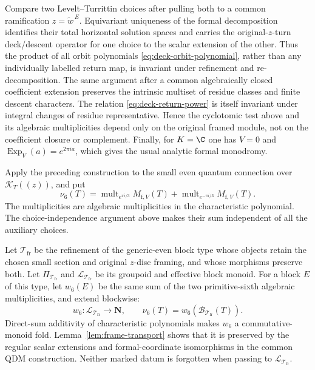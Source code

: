 Compare two Levelt--Turrittin choices after pulling both to
a common ramification \(z=\widetilde w^{\,E}\).  Equivariant uniqueness of the formal
decomposition identifies their total horizontal solution spaces and carries
the original-\(z\)-turn deck/descent operator for one choice to the scalar
extension of the other.  Thus the product of all orbit polynomials
\eqref{eq:deck-orbit-polynomial}, rather than any individually labelled
return map, is invariant under refinement and re-decomposition.  The same
argument after a common algebraically closed coefficient extension preserves
the intrinsic multiset of residue classes and finite descent characters.
The relation \eqref{eq:deck-return-power} is itself invariant under integral
changes of residue representative.  Hence the cyclotomic test above and its
algebraic multiplicities depend only on the original framed module, not on
the coefficient closure or complement.  Finally, for \(K=\C\) one has
\(V=0\) and
\(\operatorname{Exp}_V(a)=e^{2\pi i a}\), which gives the usual analytic
formal monodromy.

\begin{definition}
\label{def:framed-sixth-multiplicity}
%
%
Apply the preceding construction to the small even quantum connection over
\(\mathcal K_T((z))\), and put
\[
 \nu_6(T)=
 \operatorname{mult}_{e^{\pi i/3}}M_{\mathrm f,V}(T)+
 \operatorname{mult}_{e^{-\pi i/3}}M_{\mathrm f,V}(T).
\]
The multiplicities are algebraic multiplicities in the characteristic
polynomial.  The choice-independence argument above makes their sum independent
of all the auxiliary choices.
\end{definition}

Let \(\mathcal T_{\mathrm{fr}}\) be the refinement of the generic-even block
type whose objects retain the chosen small section and original \(z\)-disc
framing, and whose morphisms preserve both.  Let
\(\Pi_{\mathcal T_{\mathrm{fr}}}\) and
\(\mathcal L_{\mathcal T_{\mathrm{fr}}}\) be its groupoid and effective block
monoid.  For a block \(E\) of this type, let \(w_6(E)\) be the same sum of the
two primitive-sixth algebraic multiplicities, and extend blockwise:
\[
 w_6:\mathcal L_{\mathcal T_{\mathrm{fr}}}\longrightarrow\mathbf N,
 \qquad
 \nu_6(T)=w_6(\mathcal B_{\mathcal T_{\mathrm{fr}}}(T)).
 \label{eq:framed-fold}
\]
Direct-sum additivity of characteristic polynomials makes \(w_6\) a
commutative-monoid fold.  Lemma~\ref{lem:frame-transport} shows that it is
preserved by the regular scalar extensions and formal-coordinate isomorphisms
in the common QDM construction.  Neither marked datum is forgotten when passing to
\(\mathcal L_{\mathcal T_{\mathrm{fr}}}\).

